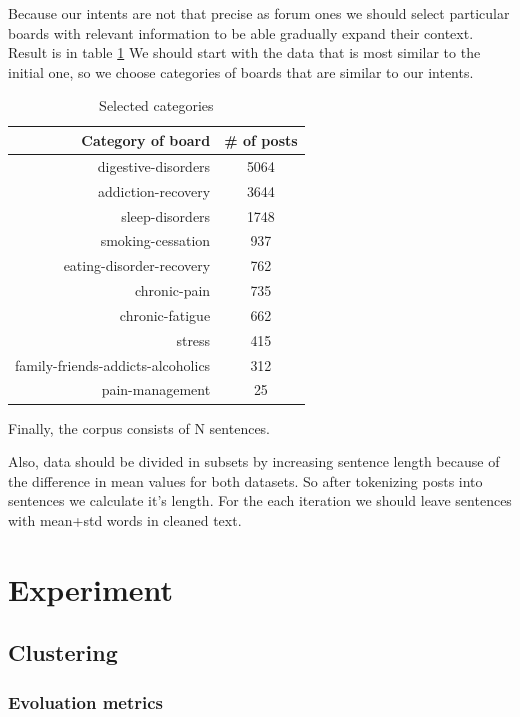 \documentclass[11pt]{article}
\begin{document}
Because our intents are not that precise as forum ones we should select particular boards with relevant information to be able gradually expand their context. Result is in table \ref{cat_freq} 
We should start with the data that is most similar to the initial one, so we choose categories of boards that are similar to our intents. 

\begin{table}[htb]
\centering
\begin{tabular}{ |r|c| }
\hline
Category of board &  \# of posts \\ \hline
digestive-disorders & 5064 \\ \hline
addiction-recovery & 3644 \\ \hline
sleep-disorders & 1748 \\ \hline
smoking-cessation & 937 \\ \hline
eating-disorder-recovery & 762 \\ \hline
chronic-pain & 735 \\ \hline
chronic-fatigue & 662 \\ \hline
stress & 415 \\ \hline
family-friends-addicts-alcoholics & 312 \\ \hline
pain-management & 25 \\ \hline
\end{tabular}
\caption{\label{cat_freq}Selected categories}
\end{table}
\FloatBarrier

Finally, the corpus consists of N  sentences. 

Also, data should be divided in subsets by increasing sentence length because of the difference in mean values for both datasets. So after tokenizing posts into sentences we calculate it's length. For the each iteration we should leave sentences with mean+std words in cleaned text.


\section{Experiment}

\subsection{Clustering}

\subsubsection{Evoluation metrics}
\end{document}

